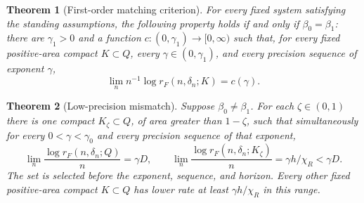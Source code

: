 \documentclass[11pt]{amsart}
\newtheorem{theorem}{Theorem}[section]
\theoremstyle{definition}
\theoremstyle{remark}
\numberwithin{equation}{section}
\begin{document}
\begin{theorem}[First-order matching criterion]\label{thm:criterion}
For every fixed system satisfying the standing assumptions, the
following property holds if and only if $\beta_0=\beta_1$:
there are $\gamma_1>0$ and a function $c:(0,\gamma_1)\to[0,\infty)$
such that, for every fixed positive-area compact $K\subset Q$,
every $\gamma\in(0,\gamma_1)$, and every precision sequence of
exponent $\gamma$,
\[
\lim_n n^{-1}\log r_F(n,\delta_n;K)=c(\gamma).
\]
\end{theorem}



\begin{theorem}[Low-precision mismatch]\label{thm:mismatch}
Suppose $\beta_0\ne\beta_1$. For each $\zeta\in(0,1)$ there is
one compact $K_\zeta\subset Q$, of area greater than $1-\zeta$,
such that simultaneously for every $0<\gamma<\gamma_0$ and
every precision sequence of that exponent,
\begin{equation}\label{eq:mismatchrates}
\lim_n\frac{\log r_F(n,\delta_n;Q)}n=\gamma D,\qquad
\lim_n\frac{\log r_F(n,\delta_n;K_\zeta)}n
                =\gamma h/\chi_R<\gamma D.
\end{equation}
The set is selected before the exponent, sequence, and horizon.
Every other fixed positive-area compact $K\subset Q$ has lower
rate at least $\gamma h/\chi_R$ in this range.
\end{theorem}
\end{document}

